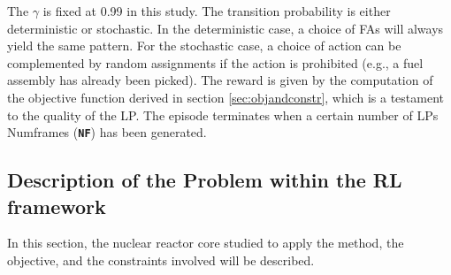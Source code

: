 \documentclass[a4paper]{article}
\newcommand{\code}[1]{\colorbox{light-gray}{\small\color{blue}\textbf{\texttt{#1}}}}
\begin{document}
The $\gamma$ is fixed at 0.99 in this study. The transition probability is either deterministic or stochastic. In the deterministic case, a choice of FAs will always yield the same pattern. For the stochastic case, a choice of action can be complemented by random assignments if the action is prohibited (e.g., a fuel assembly has already been picked). The reward is given by the computation of the objective function derived in section \ref{sec:objandconstr}, which is a testament to the quality of the LP. The episode terminates when a certain number of LPs Numframes (\code{NF}) has been generated. 

\subsection{Description of the Problem within the RL framework}
\label{sec:description}
In this section, the nuclear reactor core studied to apply the method, the objective, and the constraints involved will be described.
\end{document}
